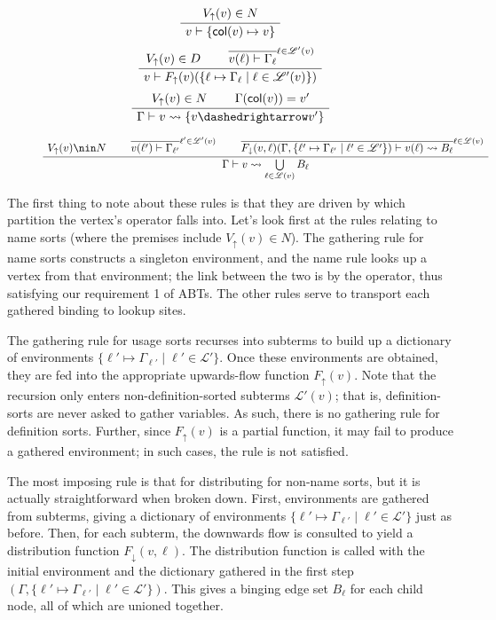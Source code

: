 \documentclass[11pt]{article} %
\theoremstyle{definition}
\newcommand{\Ell}{\mathscr{L}}
\begin{document}
\begin{figure}[H]
\centering
$$
    \AxiomC{$V_\uparrow(v) \in N$}
    \UnaryInfC{$v \vdash \{\mathsf{col}(v) \mapsto v\}$}
    \DisplayProof$$
$$
    \AxiomC{$V_\uparrow(v) \in D$}
    \AxiomC{$\overline{v(\ell) \vdash \Gamma_\ell}^{\ell \in \Ell'(v)}$}
    \BinaryInfC{$v \vdash F_\uparrow(v)(\{\ell \mapsto \Gamma_\ell \mid \ell \in \Ell'(v)\})$}
    \DisplayProof$$
$$
    \AxiomC{$V_\uparrow(v) \in N$}
    \AxiomC{$\Gamma(\mathsf{col}(v)) = v'$}
    \BinaryInfC{$\Gamma \vdash v \leadsto \{v \dashedrightarrow v'\}$}
    \DisplayProof$$

$$
    \AxiomC{$V_\uparrow(v) \nin N$}
    \AxiomC{$\overline{v(\ell') \vdash \Gamma_{\ell'}}^{\ell' \in \Ell'(v)}$}
    \AxiomC{$\overline{F_\downarrow(v, \ell)(\Gamma, \{\ell' \mapsto \Gamma_{\ell'} \mid \ell' \in \Ell'\}) \vdash v(\ell) \leadsto B_\ell}^{\ell \in \Ell(v)}$}
    \TrinaryInfC{$\Gamma \vdash v \leadsto \bigcup\limits_{\ell \in \Ell(v)} B_\ell$}
    \DisplayProof$$
\end{figure}

The first thing to note about these rules is that they are driven by which partition the vertex's operator falls into.
Let's look first at the rules relating to name sorts (where the premises include $V_\uparrow(v) \in N$).
The gathering rule for name sorts constructs a singleton environment, and the name rule looks up a vertex from that environment; the link between the two is by the operator, thus satisfying our requirement 1 of ABTs.
The other rules serve to transport each gathered binding to lookup sites.

The gathering rule for usage sorts recurses into subterms to build up a dictionary of environments $\{\ell' \mapsto \Gamma_{\ell'} \mid \ell' \in \Ell'\}$.
Once these environments are obtained, they are fed into the appropriate upwards-flow function $F_\uparrow(v)$.
Note that the recursion only enters non-definition-sorted subterms $\Ell'(v)$; that is, definition-sorts are never asked to gather variables.
As such, there is no gathering rule for definition sorts.
Further, since $F_\uparrow(v)$ is a partial function, it may fail to produce a gathered environment; in such cases, the rule is not satisfied.

The most imposing rule is that for distributing for non-name sorts, but it is actually straightforward when broken down.
First, environments are gathered from subterms, giving a dictionary of environments $\{\ell' \mapsto \Gamma_{\ell'} \mid \ell' \in \Ell'\}$ just as before.
Then, for each subterm, the downwards flow is consulted to yield a distribution function $F_\downarrow(v, \ell)$.
The distribution function is called with the initial environment and the dictionary gathered in the first step $(\Gamma, \{\ell' \mapsto \Gamma_{\ell'} \mid \ell' \in \Ell'\})$.
This gives a binging edge set $B_\ell$ for each child node, all of which are unioned together.
\end{document}
